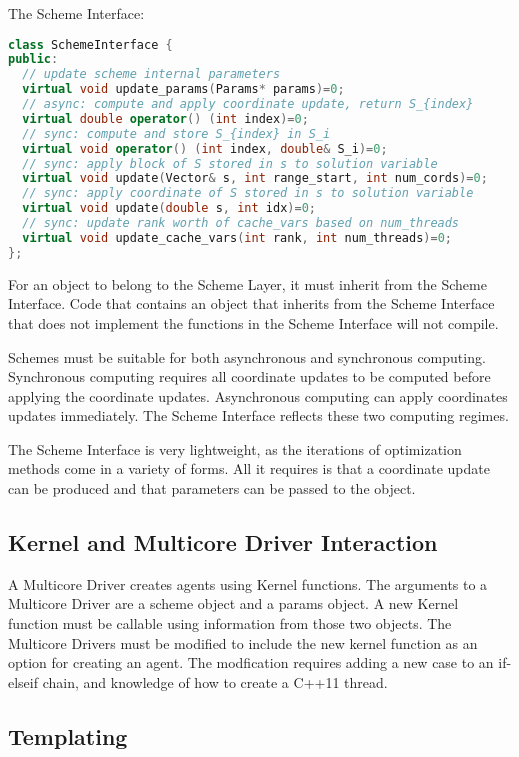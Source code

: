 The Scheme Interface:
\begin{lstlisting}[language=C++]
class SchemeInterface {
public:
  // update scheme internal parameters
  virtual void update_params(Params* params)=0;
  // async: compute and apply coordinate update, return S_{index}
  virtual double operator() (int index)=0;
  // sync: compute and store S_{index} in S_i
  virtual void operator() (int index, double& S_i)=0;
  // sync: apply block of S stored in s to solution variable
  virtual void update(Vector& s, int range_start, int num_cords)=0;
  // sync: apply coordinate of S stored in s to solution variable
  virtual void update(double s, int idx)=0;
  // sync: update rank worth of cache_vars based on num_threads
  virtual void update_cache_vars(int rank, int num_threads)=0;
};
\end{lstlisting}
For an object to belong to the Scheme Layer, it must inherit from the Scheme Interface.
Code that contains an object that inherits from the Scheme Interface that does not implement the functions in the Scheme Interface will not compile.

Schemes must be suitable for both asynchronous and synchronous computing. Synchronous computing requires all coordinate updates to be computed before applying the coordinate updates. Asynchronous computing can apply coordinates updates immediately. The Scheme Interface reflects these two computing regimes.

The Scheme Interface is very lightweight, as the iterations of optimization methods come in a variety of forms.  All it requires is that a coordinate update can be produced and that parameters can be passed to the object.

 


\subsection{Kernel and Multicore Driver Interaction}

A Multicore Driver creates agents using Kernel functions. The arguments to a Multicore Driver are a scheme object and a params object. A new Kernel function must be callable using information from those two objects. The Multicore Drivers must be modified to include the new kernel function as an option for creating an agent. The modfication requires adding a new case to an if-elseif chain, and knowledge of how to create a C++11 thread.

\subsection{Templating}

